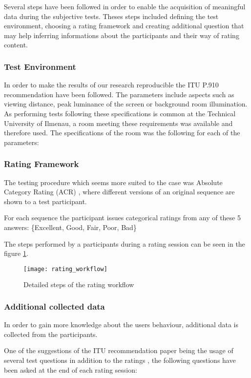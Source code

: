Several steps have been followed in order to enable the acquisition of meaningful data during the subjective tests. Theses steps included defining the test environment, choosing a rating framework and creating additional question that may help inferring informations about the participants and their way of rating content.

\subsubsection{Test Environment}
In order to make the results of our research reproducible the ITU P.910 recommendation \cite{rec1998p} have been followed. 
The parameters include aspects such as viewing distance, peak luminance of the screen or background room illumination.
As performing tests following these specifications is common at the Technical University of Ilmenau, a room meeting these requirements was available and therefore used.
The specifications of the room was the following for each of the parameters:


	
\subsubsection{Rating Framework}
The testing procedure which seems more suited to the case was Absolute Category Rating (ACR) \cite{rec1998p}, where different versions of an original sequence are shown to a test participant. 

For each sequence the participant issues categorical ratings from any of these 5 answers: \{Excellent, Good, Fair, Poor, Bad\}


The steps performed by a participants during a rating session can be seen in the figure \ref{fig:workflow:state_machine}.

\begin{figure}[h]
	\centering
	\texttt{[image: rating\_workflow]}
	\caption{Detailed steps of the rating workflow}
	\label{fig:workflow:state_machine}
\end{figure}

\subsubsection{Additional collected data}
In order to gain more knowledge about the users behaviour, additional data is collected from the participants.

One of the suggestions of the ITU recommendation paper being the usage of several test questions in addition to the ratings \cite{rec1998p}, the following questions have been asked at the end of each rating session:

